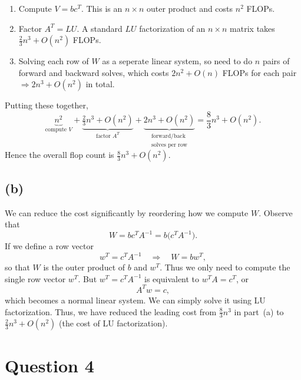 \documentclass{article}
\begin{document}
\begin{enumerate}
    \item Compute $V = bc^T$.  This is an $n\times n$ outer product and costs $n^2$ FLOPs.
    \item Factor $A^T = LU$. A standard $LU$ factorization of an $n \times n$ matrix takes $\tfrac{2}{3}n^3 + O(n^2)$ FLOPs.
    \item Solving each row of $W$ as a seperate linear system, so need to do $n$ pairs of forward and backward solves, which costs $2n^2+O(n)$ FLOPs for each pair $\Longrightarrow 2n^3+O(n^2)$ in total.
\end{enumerate}
Putting these together,
$$
    \boxed{
    \underbrace{n^2}_{\text{compute }V}
    +
    \underbrace{\tfrac{2}{3}n^3+O(n^2)}_{\text{factor }A^T}
    +
    \underbrace{2n^3+O(n^2)}_{\substack{\text{forward/back}\\\text{solves per row}}}
    =
    \frac{8}{3}n^3
    +O(n^2)
    }.
$$
Hence the overall flop count is $\frac{8}{3}n^3 + O(n^2)$.

\subsection*{(b)}
We can reduce the cost significantly by reordering how we compute $W$.
Observe that
$$
    W
    =
    bc^TA^{-1}
    =
    b
    \bigl(c^TA^{-1}\bigr).
$$
If we define a row vector
$$
    w^T = c^TA^{-1}
    \quad\Longrightarrow\quad
    W = bw^T,
$$
so that $W$ is the outer product of $b$ and $w^T$.
Thus we only need to compute the single row vector $w^T$.
But $w^T = c^TA^{-1}$ is equivalent to $w^T A = c^T$, or
$$
    A^T w = c,
$$
which becomes a normal linear system. We can simply solve it using LU factorization. Thus, we have reduced the leading cost from $\tfrac{8}{3}n^3$ in part~(a) to $\tfrac{2}{3}n^3+O(n^2)$ (the cost of LU factorization).

\newpage
\section*{Question 4}
\end{document}
